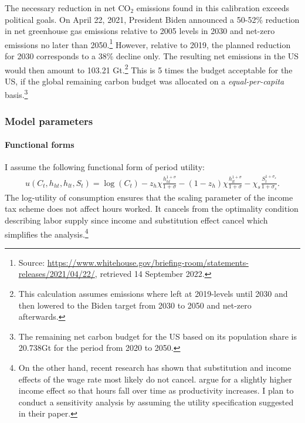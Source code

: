 The necessary reduction in net CO$_2$ emissions found in this calibration exceeds political goals. On April 22, 2021, President Biden announced a 50-52\% reduction in net greenhouse gas emissions relative to 2005 levels in 2030 %
and net-zero emissions no later than 2050.\footnote{ Source: \href{https://www.whitehouse.gov/briefing-room/statements-releases/2021/04/22/fact-sheet-president-biden-sets-2030-greenhouse-gas-pollution-reduction-target-aimed-at-creating-good-paying-union-jobs-and-securing-u-s-leadership-on-clean-energy-technologies/}{https://www.whitehouse.gov/briefing-room/statements-releases/2021/04/22/}, retrieved 14 September 2022.} 
However, relative to 2019, the planned reduction for 2030 corresponds to a 38\% decline only.
The resulting net emissions in the US would then amount to 103.21 Gt.\footnote{ This calculation assumes emissions where left at 2019-levels until 2030 and then lowered to the Biden target from 2030 to 2050 and net-zero afterwards.} This is 5 times the budget acceptable for the US,  if the global remaining carbon budget was allocated on a \textit{equal-per-capita} basis.\footnote{ The remaining net carbon budget for the US based on its population share is 20.738Gt for the period from 2020 to 2050.} %

\subsubsection{Model parameters}\label{sec:modpar}

\paragraph{Functional forms}
 I assume the following functional form of period utility:
\begin{align*}
u(C_t,h_{ht}, h_{lt}, S_t )= \log(C_t)-z_h\chi\frac{h_{ht}^{1+\sigma}}{{1+\sigma}}-(1-z_h)\chi\frac{h_{lt}^{1+\sigma}}{{1+\sigma}}-\chi_s\frac{S_t^{1+\sigma_s}}{1+\sigma_s}.
\end{align*}
 The log-utility of consumption ensures that the scaling parameter of the income tax scheme does not affect hours worked. It cancels from the optimality condition describing labor supply since income and substitution effect cancel which simplifies the analysis.\footnote{  On the other hand, recent research has shown that substitution and income effects of the wage rate most likely do not cancel. \cite{Boppart2019LaborPerspectiveb} argue for a slightly higher income effect so that hours fall over time as productivity increases. I plan to conduct a sensitivity analysis by assuming the utility specification suggested in their paper.}

